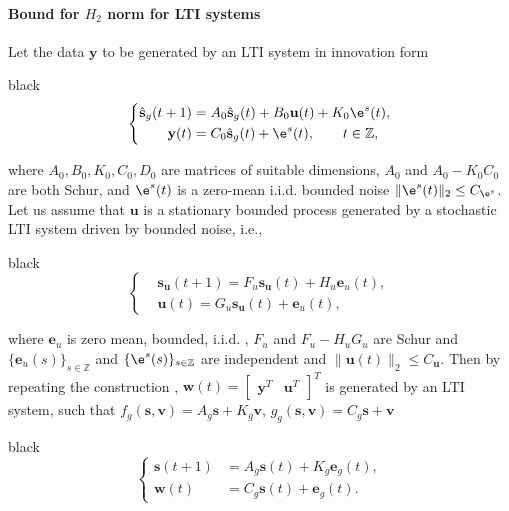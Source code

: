 \documentclass{ifacconf}
\def\rve{{\mathbf{e}}}
\def\rvu{{\mathbf{i}}}
\def\rvs{{\mathbf{s}}}
\def\rvu{{\mathbf{u}}}
\def\rvv{{\mathbf{v}}}
\def\rvw{{\mathbf{w}}}
\def\rvy{{\mathbf{y}}}
\def\sZ{{\mathbb{Z}}}
\begin{document}
\paragraph*{Bound for $H_2$ norm for \textbf{LTI systems}}
Let
the data  $\rvy$ to be generated by an LTI system in innovation form
\begin{color}{black}
\begin{equation}
\left\{
\begin{aligned}
  \hat{\rvs}_{g}(t+1) &= A_0\hat{\rvs}_{g}(t)+B_0\rvu(t)+K_0\e^s(t), \\
  \rvy(t) &= C_0\hat{\rvs}_{g}(t)+\e^s(t), \qquad t \in \sZ,
\end{aligned}
\right.
\label{eq:T0sys1}
\end{equation}
\end{color}
where $A_0,B_0,K_0,C_0,D_0$ are matrices of suitable dimensions, $A_0$ and $A_0-K_0C_0$ are both Schur, and $\e^s(t)$ is a zero-mean i.i.d. bounded noise
$\|\e^s(t)\|_2 \le C_{\e^s}$.
Let us assume that $\rvu$ is a stationary bounded process generated by a stochastic LTI system driven by bounded noise, i.e.,
\begin{color}{black}
\begin{equation}\label{eq:u_gen}
    \left\{
  \begin{split}
    & \rvs_\rvu(t+1)=F_u\rvs_\rvu(t)+H_u\rve_u(t), \\
    & \rvu(t)=G_u\rvs_\rvu(t) +\rve_u(t),
  \end{split}
  \right.
\end{equation}
\end{color}
where $\rve_u$ is zero mean, bounded, i.i.d. , $F_u$ and $F_u-H_uG_u$ are Schur and 
$\{\rve_u(s)\}_{s \in \sZ}$ and $\{\e^s(s)\}_{s \in \sZ}$ are independent
and $\|\rvu(t)\|_2 \le C_\rvu$.
Then
by repeating the construction \cite{eringis2021optimal}, 
$\rvw (t)=\begin{bmatrix} \rvy^T & \rvu^T \end{bmatrix}^T$ is generated by an LTI system, 
such that $f_{g}(\rvs,\rvv)=A_g\rvs+K_g\rvv$, $g_g(\rvs,\rvv)=C_g\rvs+\rvv$
\begin{color}{black}
\begin{equation}\label{eq:predictor_lti_input}
\left\{
  \begin{split}
    \rvs(t+1) &= A_g\rvs(t)+K_g\rve_g(t), \\
    \rvw(t)   &= C_g\rvs(t)+\rve_g(t).
  \end{split}
   \right.
\end{equation}
\end{color}
\end{document}
